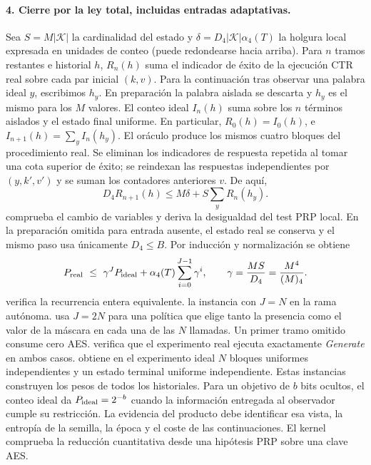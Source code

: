 \paragraph{4. Cierre por la ley total, incluidas entradas adaptativas.}
Sea \(S=M|\mathcal K|\) la cardinalidad del estado y
\(\delta=D_4|\mathcal K|\alpha_4(T)\) la holgura local expresada en
unidades de conteo (puede redondearse hacia arriba). Para \(n\) tramos
restantes e historial \(h\), \(R_n(h)\) suma el indicador de éxito de
la ejecución CTR real sobre cada par inicial \((k,v)\).
Para la continuación tras observar una palabra ideal \(y\), escribimos
\(h_y\). En preparación la palabra aislada se descarta y \(h_y\) es el
mismo para los \(M\) valores. El conteo ideal \(I_n(h)\) suma sobre los
\(n\) términos aislados y el estado final uniforme. En particular,
\(R_0(h)=I_0(h)\), e \(I_{n+1}(h)=\sum_y I_n(h_y)\).
El oráculo produce los mismos cuatro bloques del procedimiento real.
Se eliminan los indicadores de respuesta repetida al tomar una cota
superior de éxito; se reindexan las respuestas independientes por
\((y,k',v')\) y se suman los contadores anteriores \(v\). De aquí,
\[
  D_4 R_{n+1}(h)\le M\delta+S\sum_y R_n(h_y).
\]
 comprueba el cambio de
variables y  deriva la
desigualdad del test PRP local. En la preparación omitida para entrada
ausente, el estado real se conserva y el mismo paso usa únicamente
\(D_4\le B\). Por inducción y normalización se obtiene
\[
 P_{\rm real}\ \le\ \gamma^J P_{\rm ideal}
                 +\alpha_4(T)\sum_{i=0}^{J-1}\gamma^i,
 \qquad \gamma=\frac{M S}{D_4}=\frac{M^4}{(M)_4}.
\]
 verifica la recurrencia
entera equivalente. 
la instancia con \(J=N\) en la rama autónoma.
 usa
\(J=2N\) para una política que elige tanto la presencia como el valor de la
máscara en cada una de las \(N\) llamadas. Un primer tramo omitido consume
cero AES.  verifica que
el experimento real ejecuta exactamente \emph{Generate} en ambos casos.
 obtiene en el experimento ideal
\(N\) bloques uniformes independientes y un estado terminal uniforme
independiente. Estas instancias construyen los pesos de todos los historiales.
Para un objetivo de \(b\) bits ocultos, el conteo ideal da \(P_{\rm ideal}
=2^{-b}\) cuando la información entregada al observador cumple su restricción.
La evidencia del producto debe identificar esa vista, la entropía de
la semilla, la época y el coste de las continuaciones. El kernel comprueba
la reducción cuantitativa desde una hipótesis PRP sobre una clave AES.
